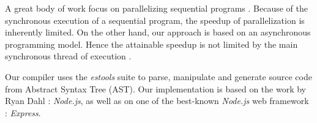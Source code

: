 A great body of work focus on parallelizing sequential programs \cite{Banerjee2013,Li2012,Matsakis2012a,Radoi2014}. %
Because of the synchronous execution of a sequential program, the speedup of parallelization is inherently limited.
On the other hand, our approach is based on an asynchronous programming model.
Hence the attainable speedup is not limited by the main synchronous thread of execution \cite{Amdahl1967,Gunther2008}.



Our compiler uses the \textit{estools} suite to parse, manipulate and generate source code from Abstract Syntax Tree (AST).
Our implementation is based on the work by Ryan Dahl : \textit{Node.js}, as well as on one of the best-known \textit{Node.js} web framework : \textit{Express}.